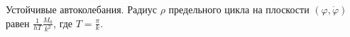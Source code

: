 Устойчивые автоколебания.
Радиус $\rho$ предельного цикла на плоскости $(\varphi, \dot{\varphi})$
равен $\frac{1}{hT}\frac{M_0}{k^2}$, где $T = \frac{\pi}{k}$.

